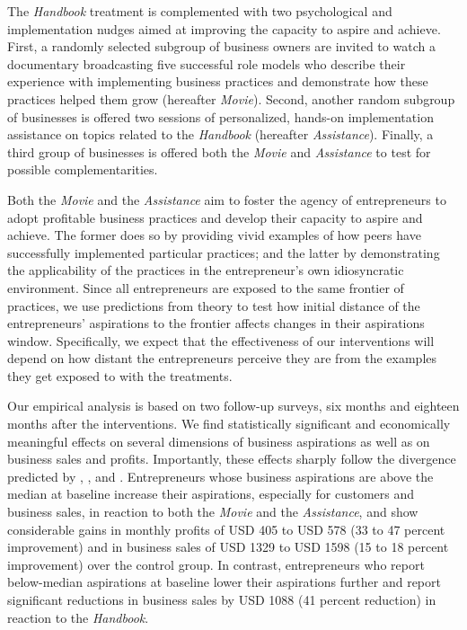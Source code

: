 \documentclass[11.5pt]{article}
\begin{document}

The \emph{Handbook} treatment is complemented with two psychological and implementation nudges aimed at improving the capacity to aspire and achieve. First, a randomly selected subgroup of business owners are invited to watch a documentary broadcasting five successful role models who describe their experience with implementing business practices and demonstrate how these practices helped them grow (hereafter \emph{Movie}).
Second, another random subgroup of businesses is offered two sessions of personalized, hands-on implementation assistance on topics related to the \emph{Handbook} (hereafter \emph{Assistance}). Finally, a third group of businesses is offered both the \emph{Movie} and \emph{Assistance} to test for possible complementarities.

Both the \emph{Movie} and the \emph{Assistance} aim to foster the agency of entrepreneurs to adopt profitable business practices and develop their capacity to aspire and achieve. The former does so by providing vivid examples of how peers have successfully implemented particular practices; and the latter by demonstrating the applicability of the practices in the entrepreneur's own idiosyncratic environment. Since all entrepreneurs are exposed to the same frontier of practices, we use predictions from theory to test how initial distance of the entrepreneurs' aspirations to the frontier affects changes in their aspirations window. Specifically, we expect that the effectiveness of our interventions will depend on how distant the entrepreneurs perceive they are from the examples they get exposed to with the treatments.

Our empirical analysis is based on two follow-up surveys, six months and eighteen months after the interventions. We find statistically significant and economically meaningful effects on several dimensions of business aspirations as well as on business sales and profits. Importantly, these effects sharply follow the divergence predicted by \citet{Ray2006}, \citet{Genicot2017}, and \citet{Dalton2016}. Entrepreneurs whose business aspirations are above the median at baseline increase their aspirations, especially for customers and business sales, in reaction to both the \emph{Movie} and the \emph{Assistance}, and show considerable gains in monthly profits of USD 405 to USD 578 (33 to 47 percent improvement) and in business sales of USD 1329 to USD 1598 (15 to 18 percent improvement) over the control group. In contrast, entrepreneurs who report below-median aspirations at baseline lower their aspirations further and report significant reductions in business sales by USD 1088 (41 percent reduction) in reaction to the \emph{Handbook}.
\end{document}
